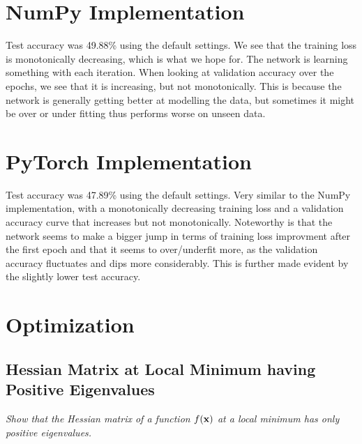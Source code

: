 \documentclass[a4paper]{article}
\begin{document}
\section{NumPy Implementation}
Test accuracy was 49.88\% using the default settings.
We see that the training loss is monotonically decreasing, which is what we hope for. The network is learning something with each
iteration. When looking at validation accuracy over the epochs, we see that it is increasing, but not monotonically. This is because
the network is generally getting better at modelling the data, but sometimes it might be over or under fitting thus performs worse
on unseen data.

\section{PyTorch Implementation}
Test accuracy was 47.89\% using the default settings.
Very similar to the NumPy implementation, with a monotonically decreasing training loss and a validation accuracy curve that increases
but not monotonically. Noteworthy is that the network seems to make a bigger jump in terms of training loss improvment after the first
epoch and that it seems to over/underfit more, as the validation accuracy fluctuates and dips more considerably. This is further
made evident by the slightly lower test accuracy.
\bigskip

\section{Optimization}
\subsection{Hessian Matrix at Local Minimum having Positive Eigenvalues}
\textit{Show that the Hessian matrix of a function $f(\mathbf{x})$ at a local minimum has only positive eigenvalues.}\\
\end{document}
